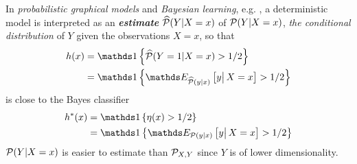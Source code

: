 \documentclass[11pt]{article}
\begin{document}
\begin{itemize}
\begin{definition}
\begin{itemize}
In \emph{probabilistic graphical models} and \emph{Bayesian learning}, e.g. \citep{koller2009probabilistic, murphy2012machine}, a deterministic model is interpreted as an \emph{\textbf{estimate}} $\widehat{{\mathcal P}}(Y| X=x)$ of ${\mathcal P}(Y| X=x)$, \emph{the conditional distribution} of $Y$ given the observations $X=x$, so that  
\begin{align*}
h(x) &= \ind{\widehat{\cP}(Y=1| X=x)>1/2}\\
&=  \ind{\E{\widehat{\cP}(y|x)}{y\big|\,X=x}>1/2}
\end{align*} is close to the Bayes classifier
\begin{align*}
h^{*}(x)&= \ind{\eta(x)>1/2}\\
&=\ind{\E{\cP(y|x)}{y\big|\,X=x}>1/2}
\end{align*} ${\mathcal P}(Y| X=x)$ is easier to estimate than ${\mathcal P}_{X,Y}$ since $Y$ is of lower dimensionality.
\end{itemize}
\end{definition}
\end{itemize}


\end{document}
